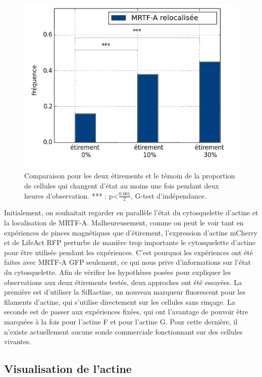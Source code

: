  \begin{figure}
 \includegraphics[scale=0.5]{Figures/Activite.png} 
 \caption{\label{Et30_ES} Comparaison pour les deux étirements et le témoin de la proportion de cellules qui changent d'état au moins une fois pendant deux heures d'observation. *** : p<$\frac{0.001}{2}$, G-test d'indépendance.}
 \end{figure}
 
Initialement, on souhaitait regarder en parallèle l'état du cytosquelette d'actine et la localisation de MRTF-A. 
Malheureusement, comme on peut le voir tant en expériences de pinces magnétiques que d'étirement, l'expression d'actine mCherry et de LifeAct RFP perturbe de manière trop importante le cytosquelette d'actine pour être utilisée pendant les expériences. 
C'est pourquoi les expériences ont été faites avec MRTF-A GFP seulement, ce qui nous prive d'informations sur l'état du cytosquelette.
Afin de vérifier les hypothèses posées pour expliquer les observations aux deux étirements testés, deux approches ont été essayées. La première est d'utiliser la SiRactine, un nouveau marqueur fluorescent pour les filaments d'actine, qui s'utilise directement sur les cellules sans rinçage. 
La seconde est de passer aux expériences fixées, qui ont l'avantage de pouvoir être marquées à la fois pour l'actine F et pour l'actine G. Pour cette dernière, il n'existe actuellement aucune sonde commerciale fonctionnant sur des cellules vivantes. 

\subsection{Visualisation de l'actine}
